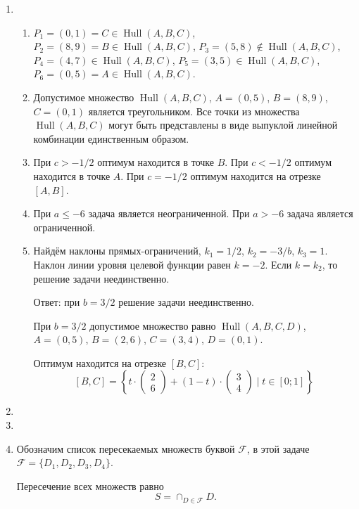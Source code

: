 \documentclass[12pt]{article}
\newcommand{\cF}{\mathcal{F}}
\DeclareMathOperator{\Hull}{Hull}
\DeclareMathOperator{\hull}{\Hull}
\begin{document}
\begin{enumerate}
  \item %
  \begin{enumerate}
    \item $P_1 = (0, 1) = C \in \hull(A, B, C)$, $P_2 = (8, 9) = B \in \hull(A, B, C)$, 
    $P_3 = (5, 8) \notin \hull(A, B, C)$, $P_4 = (4, 7) \in \hull(A, B, C)$,
    $P_5 = (3, 5) \in \hull(A, B, C)$, $P_6 = (0, 5) = A  \in \hull(A, B, C)$. 
    \item Допустимое множество $\hull(A, B, C)$, $A = (0, 5)$, $B = (8, 9)$, $C = (0, 1)$ является треугольником. 
    Все точки из множества $\hull(A, B, C)$ могут быть представлены в виде выпуклой линейной комбинации единственным образом. 
    \item При $c > -1/2$ оптимум находится в точке $B$. 
    При $c < -1/2$ оптимум находится в точке $A$. 
    При $c = -1/2$ оптимум находится на отрезке $[A, B]$.
    \item При $a \leq -6$ задача является неограниченной. 
    При $a > -6$ задача является ограниченной. 
    \item Найдём наклоны прямых-ограничений, $k_1 = 1/2$, $k_2 = -3/b$, $k_3 = 1$.
    Наклон линии уровня целевой функции равен $k = -2$.
    Если $k = k_2$, то решение задачи неединственно.
    
    Ответ: при $b = 3/2$ решение задачи неединственно. 

    При $b=3/2$ допустимое множество равно $\hull(A, B, C, D)$, $A =(0, 5)$, $B=(2, 6)$, $C=(3, 4)$, $D=(0,1)$.

    Оптимум находится на отрезке $[B, C]$:
    \[
    [B, C] =  \left\{  t \cdot \begin{pmatrix}
      2 \\
      6
    \end{pmatrix}  + (1 - t)  \cdot \begin{pmatrix}
      3 \\
      4
    \end{pmatrix}   \mid t \in [0;1] \right\}
    \]


  \end{enumerate}

\item 
\item 

\item Обозначим список пересекаемых множеств буквой $\cF$, в этой задаче $\cF = \{D_1, D_2, D_3, D_4\}$.

Пересечение всех множеств равно 
\[
  S = \cap_{D \in \cF} D.
\] 


\end{enumerate}
\end{document}
